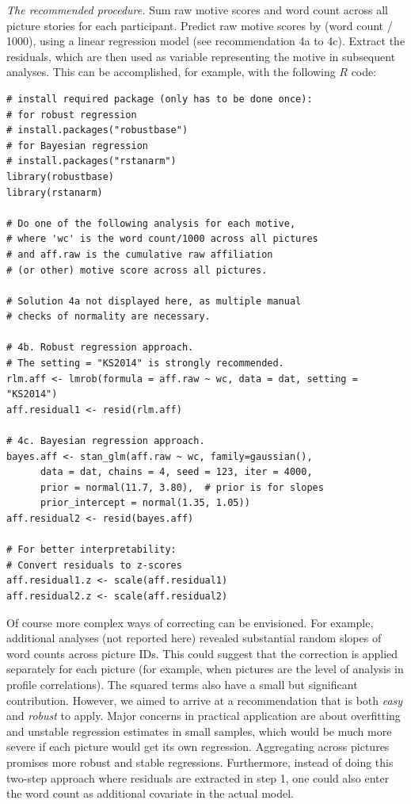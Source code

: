 \documentclass[man,a4paper,mask]{apa6}\usepackage[]{graphicx}\usepackage[]{color}
\begin{document}
\emph{The recommended procedure.} Sum raw motive scores and word count across all picture stories for each participant. Predict raw motive scores by (word count / 1000), using a linear regression model (see recommendation 4a to 4c). Extract the residuals, which are then used as variable representing the motive in subsequent analyses. This can be accomplished, for example, with the following $R$ code:

\begin{lstlisting}
# install required package (only has to be done once):
# for robust regression
# install.packages("robustbase")  
# for Bayesian regression
# install.packages("rstanarm")
library(robustbase)
library(rstanarm)

# Do one of the following analysis for each motive,
# where 'wc' is the word count/1000 across all pictures
# and aff.raw is the cumulative raw affiliation 
# (or other) motive score across all pictures.

# Solution 4a not displayed here, as multiple manual
# checks of normality are necessary.

# 4b. Robust regression approach. 
# The setting = "KS2014" is strongly recommended.
rlm.aff <- lmrob(formula = aff.raw ~ wc, data = dat, setting = "KS2014")
aff.residual1 <- resid(rlm.aff)

# 4c. Bayesian regression approach.
bayes.aff <- stan_glm(aff.raw ~ wc, family=gaussian(), 
      data = dat, chains = 4, seed = 123, iter = 4000,
      prior = normal(11.7, 3.80),  # prior is for slopes
      prior_intercept = normal(1.35, 1.05))
aff.residual2 <- resid(bayes.aff)

# For better interpretability: 
# Convert residuals to z-scores
aff.residual1.z <- scale(aff.residual1)
aff.residual2.z <- scale(aff.residual2)
\end{lstlisting}

Of course more complex ways of correcting can be envisioned. For example, additional analyses (not reported here) revealed substantial random slopes of word counts across picture IDs. This could suggest that the correction is applied separately for each picture (for example, when pictures are the level of analysis in profile correlations). The squared terms also have a small but significant contribution. However, we aimed to arrive at a recommendation that is both \emph{easy} and \emph{robust} to apply. Major concerns in practical application are about overfitting and unstable regression estimates in small samples, which would be much more severe if each picture would get its own regression. Aggregating across pictures promises more robust and stable regressions. Furthermore, instead of doing this two-step approach where residuals are extracted in step 1, one could also enter the word count as additional covariate in the actual model.
\end{document}
